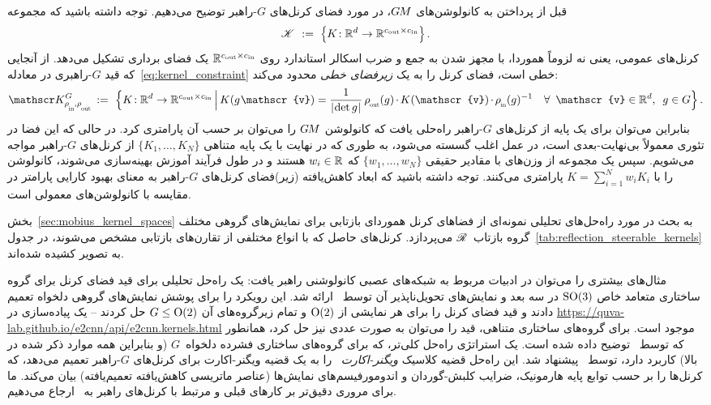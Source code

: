 قبل از پرداختن به کانولوشن‌های $G\mkern-1.4muM$، در مورد فضای کرنل‌های $G$-راهبر توضیح می‌دهیم.
توجه داشته باشید که مجموعه
\begin{align}\label{eq:unconstrained_kernel_space}
	\mathscr{K}\ :=\ \pig\{ K\!: \R^d \to \R^{\cout\times\cin} \pig\} \,.
\end{align}
کرنل‌های عمومی، یعنی نه لزوماً هموردا، با مجهز شدن به جمع و ضرب اسکالر استاندارد روی $\mathbb{R}^{{c_\textup{out}}\times{c_\textup{in}}}$ یک فضای برداری تشکیل می‌دهد.
از آنجایی که قید $G$-راهبری در معادله~\eqref{eq:kernel_constraint} خطی است، فضای کرنل را به یک \emph{زیرفضای خطی} محدود می‌کند:
\begin{align}\label{eq:G-steerable_kernel_space}
	\KG\, :=\ \Big\{ K\!: \R^d \to \R^{\cout\times\cin} \,\Big|\,
	K(g\mkern1mu \mathscr{v}) = \frac{1}{\detg}\, \rhoout(g) \mkern-1.5mu\cdot\mkern-1.5mu K(\mathscr{v}) \mkern-1.5mu\cdot\mkern-1.5mu \rhoin(g)^{-1} \ \ \ \forall\,\ \mathscr{v}\in \R^d,\,\ g\in G \Big\} \,.
\end{align}
بنابراین می‌توان برای یک پایه از کرنل‌های $G$-راهبر راه‌حلی یافت که کانولوشن $G\mkern-1.4muM$ را می‌توان بر حسب آن پارامتری کرد.
در حالی که این فضا در تئوری معمولاً بی‌نهایت-بعدی است، در عمل اغلب گسسته می‌شود، به طوری که در نهایت با یک پایه متناهی $\{K_1,\dots,K_N\}$ از کرنل‌های $G$-راهبر مواجه می‌شویم.
سپس یک مجموعه از وزن‌های با مقادیر حقیقی $\{w_1,\dots,w_N\}$ که $w_i\in\mathbb{R}$ هستند و در طول فرآیند آموزش بهینه‌سازی می‌شوند، کانولوشن را با $K = \sum_{i=1}^N w_i K_i$ پارامتری می‌کنند.
توجه داشته باشید که ابعاد کاهش‌یافته (زیر)فضای کرنل‌های $G$-راهبر به معنای بهبود کارایی پارامتر در مقایسه با کانولوشن‌های معمولی است.

بخش~\ref{sec:mobius_kernel_spaces} به بحث در مورد راه‌حل‌های تحلیلی نمونه‌ای از فضاهای کرنل هموردای بازتابی برای نمایش‌های گروهی مختلف گروه بازتاب~$\mathscr{R}$ می‌پردازد.
کرنل‌های حاصل که با انواع مختلفی از تقارن‌های بازتابی مشخص می‌شوند، در جدول~\ref{tab:reflection_steerable_kernels} به تصویر کشیده شده‌اند.

مثال‌های بیشتری را می‌توان در ادبیات مربوط به شبکه‌های عصبی کانولوشنی راهبر یافت:
یک راه‌حل تحلیلی برای قید فضای کرنل برای گروه ساختاری متعامد خاص $\operatorname{SO}(3)$ در سه بعد و نمایش‌های تحویل‌ناپذیر آن توسط~\citet{3d_steerableCNNs} ارائه شد.
\citet{Weiler2019_E2CNN} این رویکرد را برای پوشش نمایش‌های گروهی دلخواه تعمیم دادند و قید فضای کرنل را برای هر نمایشی از $\operatorname{O}(2)$ و تمام زیرگروه‌های آن $G\leq\operatorname{O}(2)$ حل کردند
-- یک پیاده‌سازی در \url{https://quva-lab.github.io/e2cnn/api/e2cnn.kernels.html} موجود است.
برای گروه‌های ساختاری متناهی، قید را می‌توان به صورت عددی نیز حل کرد، همانطور که توسط~\citet{Cohen2017-STEER} توضیح داده شده است.
یک استراتژی راه‌حل کلی‌تر، که برای گروه‌های ساختاری فشرده دلخواه~$G$ (و بنابراین همه موارد ذکر شده در بالا) کاربرد دارد، توسط~\citet{lang2020WignerEckart} پیشنهاد شد.
این راه‌حل قضیه کلاسیک \emph{ویگنر-اکارت}~\cite{agrawalla1980WignerEckart,jeevanjee2011reprOp,wigner1931gruppentheorie,wigner1993matrices} را به یک قضیه ویگنر-اکارت برای کرنل‌های $G$-راهبر تعمیم می‌دهد، که کرنل‌ها را بر حسب توابع پایه هارمونیک، ضرایب کلبش-گوردان و اندومورفیسم‌های نمایش‌ها (عناصر ماتریسی کاهش‌یافته تعمیم‌یافته) بیان می‌کند.
ما برای مروری دقیق‌تر بر کارهای قبلی و مرتبط با کرنل‌های راهبر به~\cite{lang2020WignerEckart} ارجاع می‌دهیم.

